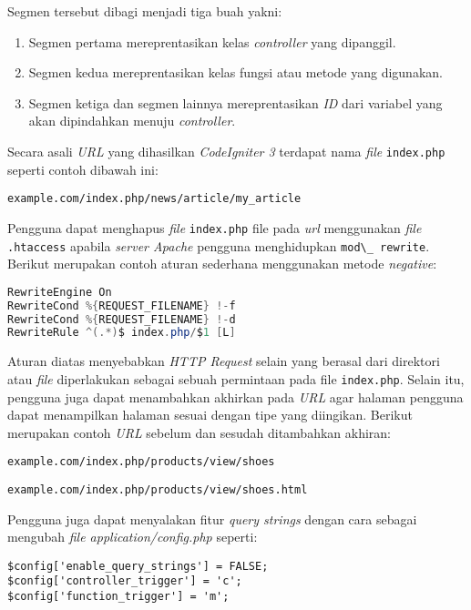 Segmen tersebut dibagi menjadi tiga buah yakni:
\begin{enumerate}
\item Segmen pertama mereprentasikan kelas \textit{controller} yang dipanggil.
\item Segmen kedua mereprentasikan kelas fungsi atau metode yang digunakan.
\item Segmen ketiga dan segmen lainnya mereprentasikan \textit{ID} dari variabel yang akan dipindahkan menuju \textit{controller}.
\end{enumerate}

Secara asali \textit{URL} yang dihasilkan \textit{CodeIgniter 3} terdapat nama \textit{file} \verb|index.php| seperti contoh dibawah ini:

\begin{center}
\verb|example.com/index.php/news/article/my_article|
\end{center}

Pengguna dapat menghapus \textit{file} \verb|index.php| file pada \textit{url} menggunakan \textit{file} \verb|.htaccess| apabila \textit{server Apache} pengguna menghidupkan \verb|mod\_ rewrite|. Berikut merupakan contoh aturan sederhana menggunakan metode \textit{negative}:

\begin{lstlisting}[language=Java, caption=Contoh \textit{path} pada halaman index.php, label=kode:htaccess]
RewriteEngine On
RewriteCond %{REQUEST_FILENAME} !-f
RewriteCond %{REQUEST_FILENAME} !-d
RewriteRule ^(.*)$ index.php/$1 [L]
\end{lstlisting}

Aturan diatas menyebabkan \textit{HTTP Request} selain yang berasal dari direktori atau \textit{file} diperlakukan sebagai sebuah permintaan pada file \verb|index.php|. Selain itu, pengguna juga dapat menambahkan akhirkan pada \textit{URL} agar halaman pengguna dapat menampilkan halaman sesuai dengan tipe yang diingikan. Berikut merupakan contoh \textit{URL} sebelum dan sesudah ditambahkan akhiran: 

\begin{center}
\verb|example.com/index.php/products/view/shoes|

\verb|example.com/index.php/products/view/shoes.html|
\end{center}

Pengguna juga dapat menyalakan fitur \textit{query strings} dengan cara sebagai mengubah \textit{file application/config.php} seperti:

\begin{lstlisting}[caption=\textit{File application/config.php}, label=kode:querystring]
$config['enable_query_strings'] = FALSE;
$config['controller_trigger'] = 'c';
$config['function_trigger'] = 'm';
\end{lstlisting}

